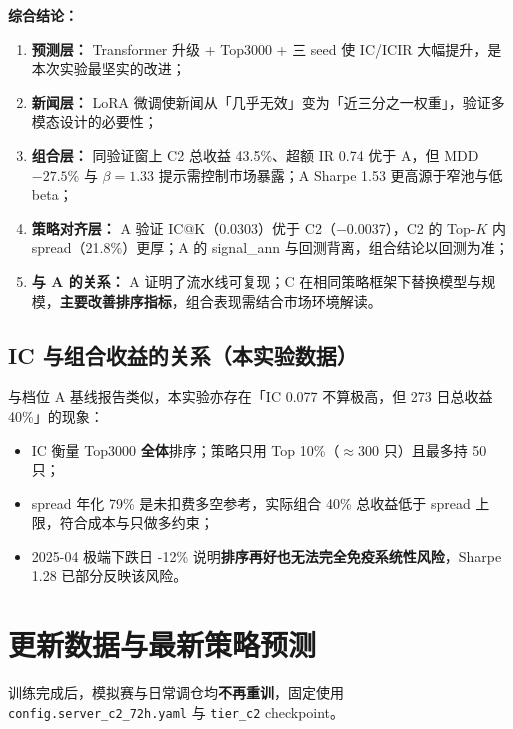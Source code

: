 \documentclass[UTF8,a4paper,12pt]{ctexart}
\begin{document}
\textbf{综合结论：}
\begin{enumerate}[leftmargin=2em]
  \item \textbf{预测层：} Transformer 升级 + Top3000 + 三 seed 使 IC/ICIR 大幅提升，是本次实验最坚实的改进；
  \item \textbf{新闻层：} LoRA 微调使新闻从「几乎无效」变为「近三分之一权重」，验证多模态设计的必要性；
  \item \textbf{组合层：} 同验证窗上 C2 总收益 43.5\%、超额 IR 0.74 优于 A，但 MDD $-27.5\%$ 与 $\beta=1.33$ 提示需控制市场暴露；A Sharpe 1.53 更高源于窄池与低 beta；
  \item \textbf{策略对齐层：} A 验证 IC@K（0.0303）优于 C2（$-$0.0037），C2 的 Top-$K$ 内 spread（21.8\%）更厚；A 的 signal\_ann 与回测背离，组合结论以回测为准；
  \item \textbf{与 A 的关系：} A 证明了流水线可复现；C 在相同策略框架下替换模型与规模，\textbf{主要改善排序指标}，组合表现需结合市场环境解读。
\end{enumerate}

\subsection{IC 与组合收益的关系（本实验数据）}

与档位 A 基线报告类似，本实验亦存在「IC 0.077 不算极高，但 273 日总收益 40\%」的现象：
\begin{itemize}[leftmargin=2em]
  \item IC 衡量 Top3000 \textbf{全体}排序；策略只用 Top 10\%（$\approx$300 只）且最多持 50 只；
  \item spread 年化 79\% 是未扣费多空参考，实际组合 40\% 总收益低于 spread 上限，符合成本与只做多约束；
  \item 2025-04 极端下跌日 -12\% 说明\textbf{排序再好也无法完全免疫系统性风险}，Sharpe 1.28 已部分反映该风险。
\end{itemize}

\section{更新数据与最新策略预测}
\label{sec:predict-update}

训练完成后，模拟赛与日常调仓均\textbf{不再重训}，固定使用 \texttt{config.server\_c2\_72h.yaml} 与 \texttt{tier\_c2} checkpoint。
\end{document}
